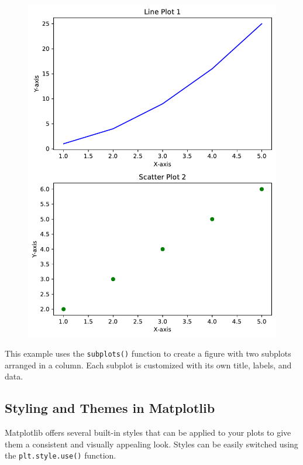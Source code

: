 \documentclass[
  letterpaper,
  DIV=11,
  numbers=noendperiod]{scrreprt}
\begin{document}
\begin{figure}[H]

{\centering \includegraphics{15_Data_Vis_files/figure-pdf/cell-7-output-1.pdf}

}

\end{figure}

This example uses the \texttt{subplots()} function to create a figure
with two subplots arranged in a column. Each subplot is customized with
its own title, labels, and data.

\hypertarget{styling-and-themes-in-matplotlib}{%
\subsection{Styling and Themes in
Matplotlib}\label{styling-and-themes-in-matplotlib}}

Matplotlib offers several built-in styles that can be applied to your
plots to give them a consistent and visually appealing look. Styles can
be easily switched using the \texttt{plt.style.use()} function.
\end{document}
